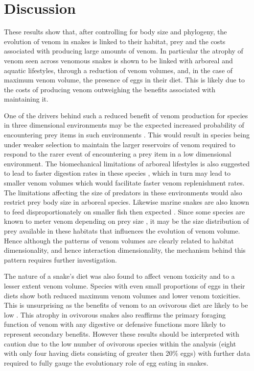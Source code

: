 \section{Discussion}


These results show that, after controlling for body size and phylogeny, the evolution of venom in snakes is linked to their habitat, prey and the costs associated with producing large amounts of venom. In particular the atrophy of venom seen across venomous snakes is shown to be linked with arboreal and aquatic lifestyles, through a reduction of venom volumes,  and, in the case of maximum venom volume, the presence of eggs in their diet. This is likely due to the costs of producing venom \citep{pintor2010costs} outweighing the benefits associated with maintaining it. 


One of the drivers behind such a reduced benefit of venom production for species in three dimensional environments may be the expected increased probability of encountering prey items in such environments \citep{pawar2012dimensionality}. This would result in species being under weaker selection to maintain the larger reservoirs of venom required to respond to the rarer event of encountering a prey item in a low dimensional environment. The biomechanical limitations of arboreal lifestyles is also suggested to lead to faster digestion rates in these species \citep{lillywhite2002patterns}, which in turn may lead to smaller venom volumes which would facilitate faster venom replenishment rates. The limitations affecting the size of predators in these environments would also restrict prey body size in arboreal species. Likewise marine snakes are also known to feed disproportionately on smaller fish then expected \citep{voris1981size}. Since some species are known to meter venom depending on prey size \citep{hayes1995venom}, it may be the size distribution of prey available in these habitats that influences the evolution of venom volume. Hence although the patterns of venom volumes are clearly related to habitat dimensionality, and hence interaction dimensionality, the mechanism behind this pattern requires further investigation. %


The nature of a snake's diet was also found to affect venom toxicity and to a lesser extent venom volume. Species with even small proportions of eggs in their diets show both reduced maximum venom volumes and lower venom toxicities. This is unsurprising as the benefits of venom to an ovivorous diet are likely to be low \citep{li2005eggs}. This atrophy in ovivorous snakes also reaffirms the primary foraging function of venom with any digestive \citep{rodriguez1992venom} or defensive functions \citep{jansa2011adaptive} more likely to represent secondary benefits. However these results should be interpreted with caution due to the low number of ovivorous species within the analysis (eight with only four having diets consisting of greater then 20\% eggs) with further data required to fully gauge the evolutionary role of egg eating in snakes. 


